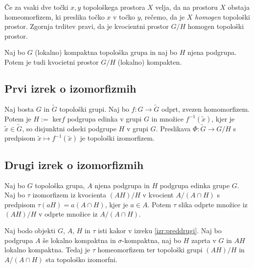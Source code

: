 \documentclass[mat1]{fmfdelo}
\begin{document}
\begin{opomba}\label{opo:homogenkvoc}
	Če za vsaki dve točki $x, y$ topološkega prostora $X$ velja, da na prostoru $X$ obstaja homeomorfizem, ki preslika točko $x$ v točko $y$, rečemo, da je $X$ \emph{homogen} topološki prostor. Zgornja trditev pravi, da je kvocientni prostor $G/H$ homogen topološki prostor.
\end{opomba}

\begin{trditev}\label{trd:kvockompakt}
	Naj bo $G$ (lokalno) kompaktna topološka grupa in naj bo $H$ njena podgrupa. Potem je tudi kvocietni prostor $G/H$ (lokalno) kompakten.
\end{trditev}

\subsection{Prvi izrek o izomorfizmih}
\begin{izrek}\label{izr:prvitopizrek}
Naj bosta $G$ in $\widetilde{G}$ topološki grupi. Naj bo $f: G \to \widetilde{G}$ odprt, zvezen homomorfizem. Potem je $H :=$ ker$f$ podgrupa edinka v grupi $G$ in množice $f^{-1}(\tilde{x})$, kjer je $\tilde{x} \in \widetilde{G}$, so disjunktni odseki podgrupe $H$ v grupi $G$. Preslikava $\Phi:\widetilde{G} \to G/H$ s predpisom $\tilde{x} \mapsto f^{-1}(\tilde{x})$ je topološki izomorfizem.
\end{izrek}

\subsection{Drugi izrek o izomorfizmih}
\begin{izrek}\label{izr:preddrugi}
Naj bo $G$ topološka grupa, $A$ njena podgrupa in $H$ podgrupa edinka grupe $G$. Naj bo $\tau$ izomorfizem iz kvocienta $(AH)/H$ v kvocient $A/(A \cap H)$ s predpisom $\tau (aH) = a(A \cap H)$, kjer je $a \in A$. Potem $\tau$ slika odprte množice iz $(AH)/H$ v odprte množice iz $A/(A \cap H)$.
\end{izrek}

\begin{izrek}\label{izr:drugitopizrek}
Naj bodo objekti $G$, $A$, $H$ in $\tau$ isti kakor v izreku \ref{izr:preddrugi}. Naj bo podgrupa $A$ še lokalno kompaktna in $\sigma$-kompaktna, naj bo $H$ zaprta v $G$ in $AH$ lokalno kompaktna. Tedaj je $\tau$ homeomorfizem ter topološki grupi $(AH)/H$ in $A/(A \cap H)$ sta topološko izomorfni.
\end{izrek}
\end{document}
